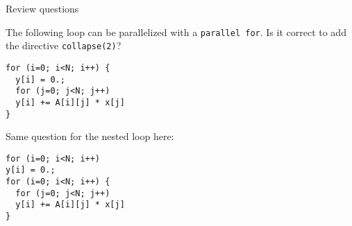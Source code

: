  {Review questions}

\begin{exercise}
  The following loop can be parallelized with a \lstinline+parallel for+.
  Is it correct to add the directive \lstinline+collapse(2)+?

\begin{lstlisting}
for (i=0; i<N; i++) {
  y[i] = 0.;
  for (j=0; j<N; j++)
  y[i] += A[i][j] * x[j]
}
\end{lstlisting}
\end{exercise}

\begin{exercise}
  Same question for the nested loop here:

\begin{lstlisting}
for (i=0; i<N; i++)
y[i] = 0.;
for (i=0; i<N; i++) {
  for (j=0; j<N; j++)
  y[i] += A[i][j] * x[j]
}
\end{lstlisting}
\end{exercise}
